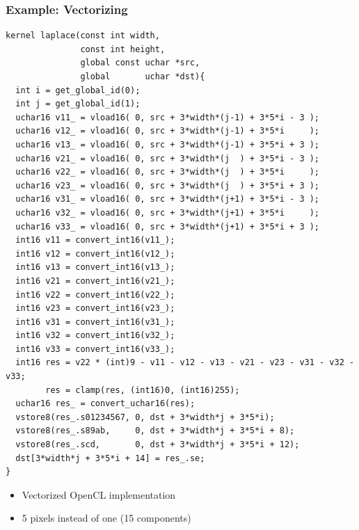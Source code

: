 \documentclass{beamer}
\begin{document}
\begin{frame}[fragile]
  \frametitle{Example: Vectorizing}
\fontsize{3}{3}\selectfont
\begin{lstlisting}
kernel laplace(const int width,
               const int height,
               global const uchar *src,
               global       uchar *dst){
  int i = get_global_id(0);
  int j = get_global_id(1);
  uchar16 v11_ = vload16( 0, src + 3*width*(j-1) + 3*5*i - 3 );
  uchar16 v12_ = vload16( 0, src + 3*width*(j-1) + 3*5*i     );
  uchar16 v13_ = vload16( 0, src + 3*width*(j-1) + 3*5*i + 3 );
  uchar16 v21_ = vload16( 0, src + 3*width*(j  ) + 3*5*i - 3 );
  uchar16 v22_ = vload16( 0, src + 3*width*(j  ) + 3*5*i     );
  uchar16 v23_ = vload16( 0, src + 3*width*(j  ) + 3*5*i + 3 );
  uchar16 v31_ = vload16( 0, src + 3*width*(j+1) + 3*5*i - 3 );
  uchar16 v32_ = vload16( 0, src + 3*width*(j+1) + 3*5*i     );
  uchar16 v33_ = vload16( 0, src + 3*width*(j+1) + 3*5*i + 3 );
  int16 v11 = convert_int16(v11_);
  int16 v12 = convert_int16(v12_);
  int16 v13 = convert_int16(v13_);
  int16 v21 = convert_int16(v21_);
  int16 v22 = convert_int16(v22_);
  int16 v23 = convert_int16(v23_);
  int16 v31 = convert_int16(v31_);
  int16 v32 = convert_int16(v32_);
  int16 v33 = convert_int16(v33_);
  int16 res = v22 * (int)9 - v11 - v12 - v13 - v21 - v23 - v31 - v32 - v33;
        res = clamp(res, (int16)0, (int16)255);
  uchar16 res_ = convert_uchar16(res);
  vstore8(res_.s01234567, 0, dst + 3*width*j + 3*5*i);
  vstore8(res_.s89ab,     0, dst + 3*width*j + 3*5*i + 8);
  vstore8(res_.scd,       0, dst + 3*width*j + 3*5*i + 12);
  dst[3*width*j + 3*5*i + 14] = res_.se;
}
\end{lstlisting}
\begin{itemize}
\item Vectorized OpenCL implementation
\item 5 pixels instead of one (15 components)
\end{itemize}
\end{frame}
\end{document}
